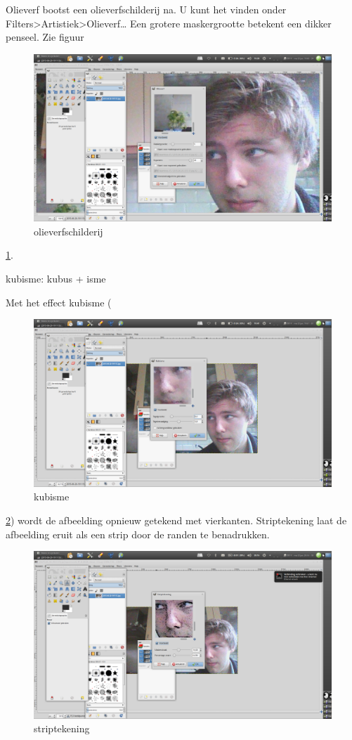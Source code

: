 \documentclass[11pt,a5paper,twoside]{book}
\begin{document}
  \label{ding:olieverf}
   Olieverf bootst een olieverfschilderij na. U kunt het vinden onder
    Filters>Artistiek>Olieverf… Een grotere maskergrootte betekent een dikker
    penseel. Zie figuur \begin{figure}
     \includegraphics[width=0.90\linewidth]{oppepper/olieverf.png}
     \caption{olieverfschilderij}
     \label{gx:olieverf}
    \end{figure}\ref{gx:olieverf}.
  \label{ding:kubisme}
   \begin{center}
    kubisme: kubus + isme
   \end{center}
   Met het effect kubisme (\begin{figure}
    \includegraphics[width=0.90\linewidth]{oppepper/kubisme.png}
    \caption{kubisme}%
    \label{gx:kubisme}
   \end{figure}\ref{gx:kubisme}) wordt de afbeelding opnieuw getekend met
    vierkanten.
  \label{ding:striptekening}
   Striptekening laat de afbeelding eruit als een strip door de randen te
    benadrukken. \begin{figure}
     \includegraphics[width=0.90\linewidth]{oppepper/strip.png}
     \caption{striptekening}
     \label{gx:striptekening}
    \end{figure}
\end{document}
